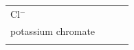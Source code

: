 \begin{enumerate}[noitemsep, label=\textbf{\arabic*}. ]
{\begin{tabular}[t]{|l|l|l|l|}
        \begin{math}\mathrm{Cl}{}^{-}\end{math} &
    
    
     \tabularnewline\cline{1-1}\cline{2-2}\cline{3-3}\cline{4-4}
    
    
        potassium chromate &
    
    
         &
    
    
         &
    
    
     \tabularnewline\cline{1-1}\cline{2-2}\cline{3-3}\cline{4-4}
    
    
         &
    
    
         &
    

\end{tabular}}
\end{enumerate}
